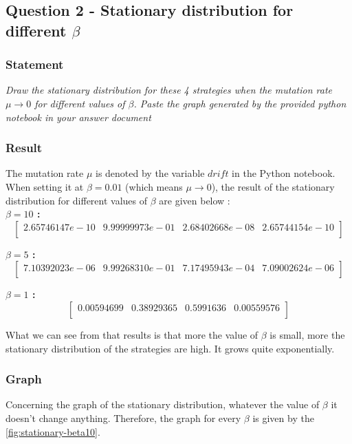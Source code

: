 \documentclass{article}
\begin{document}
\newpage 
\subsection{Question 2 - Stationary distribution for different $\beta$}

\subsubsection*{Statement}

\textit{Draw the stationary	distribution for these 4 strategies	when the mutation rate $\mu \rightarrow 0$ for different values of $\beta$.	 Paste the graph generated by the provided	python notebook in your	answer document}

\subsubsection{Result}
The mutation rate $\mu$ is denoted by the variable $drift$ in the Python notebook. When setting it at \textbf{$\beta = 0.01$} (which means $\mu \rightarrow 0$), the result of the stationary distribution for different values of $\beta$ are given below : \\

\textbf{$\beta = 10$ :} 
$$
\begin{bmatrix} 
 2.65746147e-10  & 9.99999973e-01 &  2.68402668e-08 &  2.65744154e-10 \\
\end{bmatrix}
$$

\textbf{$\beta = 5$ :} 
$$
\begin{bmatrix} 
 7.10392023e-06 &  9.99268310e-01  & 7.17495943e-04  & 7.09002624e-06 \\
\end{bmatrix}
$$

\textbf{$\beta = 1$ :} 
$$
\begin{bmatrix} 
0.00594699 & 0.38929365 & 0.5991636 &  0.00559576 \\
\end{bmatrix}
$$

What we can see from that results is that more the value of $\beta$ is small, more the stationary distribution of the strategies are high. It grows quite exponentially. 

\subsubsection{Graph}

Concerning the graph of the stationary distribution, whatever the value of $\beta$ it doesn't change anything. Therefore, the graph for every $\beta$ is given by the \autoref{fig:stationary-beta10}.
\end{document}
